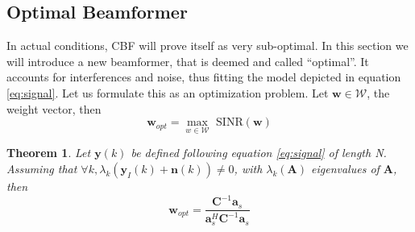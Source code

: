 \documentclass[12pt]{article}
\newtheorem{theorem}{Theorem}
\begin{document}
\subsection{Optimal Beamformer}
In actual conditions, CBF will prove itself as very sub-optimal. In this section we will introduce a new beamformer, that is deemed and called ``optimal''. It accounts for interferences and noise, thus fitting the model depicted in equation \ref{eq:signal}. Let us formulate this as an optimization problem. Let $\mathbf{w}\in\mathcal{W}$, the weight vector, then
\begin{equation}
    \mathbf{w}_{opt} = \max_{w\in\mathcal{W}}  \text{ SINR}(\mathbf{w})
\end{equation}
\begin{theorem}
    Let $\mathbf{y}(k)$ be defined following equation \ref{eq:signal} of length N. Assuming that $\forall k, \lambda_k(\mathbf{y}_I(k)+\mathbf{n}(k)) \neq 0$, with $\lambda_k(\mathbf{A})$ eigenvalues of $\mathbf{A}$, then 
    \begin{equation}\label{eq:wopt}
        \mathbf{w}_{opt} = \frac{\mathbf{C}^{-1}\mathbf{a}_s}{\mathbf{a}_s^H\mathbf{C}^{-1}\mathbf{a}_s}
    \end{equation}
\end{theorem}
\end{document}
